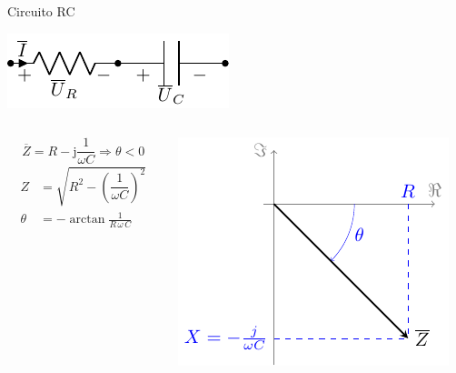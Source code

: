 \documentclass[aspectratio=169, xcolor={usenames,svgnames,dvipsnames}]{beamer}
\begin{document}
\begin{frame}{Circuito RC}
\begin{center}
\includegraphics[height=0.2\textheight]{../figs/RC.pdf}
\end{center}

\begin{columns}
\begin{column}{0.45\columnwidth}
\[
\overline{Z} = R - \mathrm{j}\dfrac{1}{\omega C} \Rightarrow \boxed{\theta < 0}
\]
\begin{align*}
    Z &= \sqrt{R^2 - \left(\dfrac{1}{\omega C}\right)^2}\\
    \theta &= -\arctan{\frac{1}{R\,\omega\,C}}
\end{align*}
\end{column}

\begin{column}{0.55\columnwidth}
\begin{center}
\includegraphics[width=.8\linewidth]{../figs/fasorCondensadorReal.pdf}
\end{center}
\end{column}
\end{columns}
\end{frame}
\end{document}
